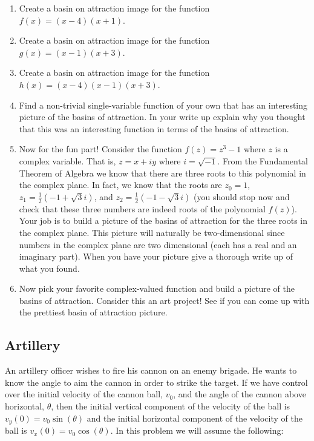 \documentclass[
]{book}
\theoremstyle{definition}
\theoremstyle{definition}
\theoremstyle{definition}
\theoremstyle{remark}
\begin{document}
\begin{enumerate}
\def\labelenumi{\arabic{enumi}.}
\item
  Create a basin on attraction image for the function \(f(x) = (x-4)(x+1)\).
\item
  Create a basin on attraction image for the function \(g(x) = (x-1)(x+3)\).
\item
  Create a basin on attraction image for the function \(h(x) = (x-4)(x-1)(x+3)\).
\item
  Find a non-trivial single-variable function of your own that has an interesting
  picture of the basins of attraction. In your write up explain why you thought that this was an interesting function in terms of the basins of attraction.
\item
  Now for the fun part! Consider the function \(f(z) = z^3 - 1\) where
  \(z\) is a complex variable. That is, \(z = x + iy\) where
  \(i = \sqrt{-1}\). From the Fundamental Theorem of Algebra we know
  that there are three roots to this polynomial in the complex plane.
  In fact, we know that the roots are \(z_0 =  1\), \(z_1 = \frac{1}{2}\left( -1 + \sqrt{3} i \right)\), and
  \(z_2 =  \frac{1}{2} \left( -1 - \sqrt{3} i \right)\) (you should stop
  now and check that these three numbers are indeed roots of the
  polynomial \(f(z)\)). Your job is to build a picture of the basins of
  attraction for the three roots in the complex plane. This picture
  will naturally be two-dimensional since numbers in the complex plane
  are two dimensional (each has a real and an imaginary part). When
  you have your picture give a thorough write up of what you found.
\item
  Now pick your favorite complex-valued function and build a picture
  of the basins of attraction. Consider this an art project! See if
  you can come up with the prettiest basin of attraction picture.
\end{enumerate}

\hypertarget{artillery}{%
\subsection{Artillery}\label{artillery}}

An artillery officer wishes to fire his cannon on an enemy brigade. He wants to know the angle to aim the cannon in order to strike the target. If we have control over the initial velocity of the cannon ball, \(v_0\), and the angle of the cannon above horizontal, \(\theta\), then the initial vertical component of the velocity of the ball is \(v_y(0) = v_0 \sin(\theta)\) and the initial horizontal component of the velocity of the ball is \(v_x(0) = v_0 \cos(\theta)\). In this problem we will assume the following:
\end{document}
